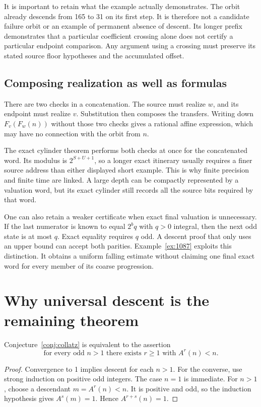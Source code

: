 It is important to retain what the example actually demonstrates. The orbit already descends from 165 to 31 on its first step. It is therefore not a candidate failure orbit or an example of permanent absence of descent. Its longer prefix demonstrates that a particular coefficient crossing alone does not certify a particular endpoint comparison. Any argument using a crossing must preserve its stated source floor hypotheses and the accumulated offset.

\subsection{Composing realization as well as formulas}
There are two checks in a concatenation. The source must realize $w$, and its endpoint must realize $v$. Substitution then composes the transfers. Writing down $F_v(F_w(n))$ without those two checks gives a rational affine expression, which may have no connection with the orbit from $n$.

The exact cylinder theorem performs both checks at once for the concatenated word. Its modulus is $2^{S+U+1}$, so a longer exact itinerary usually requires a finer source address than either displayed short example. This is why finite precision and finite time are linked. A large depth can be compactly represented by a valuation word, but its exact cylinder still records all the source bits required by that word.

One can also retain a weaker certificate when exact final valuation is unnecessary. If the last numerator is known to equal $2^b q$ with $q>0$ integral, then the next odd state is at most $q$. Exact equality requires $q$ odd. A descent proof that only uses an upper bound can accept both parities. Example~\ref{ex:1087} exploits this distinction. It obtains a uniform falling estimate without claiming one final exact word for every member of its coarse progression.

\section{Why universal descent is the remaining theorem}
\begin{theorem}\label{thm:induction}
Conjecture~\ref{conj:collatz} is equivalent to the assertion
\begin{equation}\label{eq:universal}
\text{for every odd }n>1\text{ there exists }r\ge1\text{ with }A^r(n)<n.
\end{equation}
\end{theorem}
\begin{proof}
Convergence to 1 implies descent for each $n>1$. For the converse, use strong induction on positive odd integers. The case $n=1$ is immediate. For $n>1$, choose a descendant $m=A^r(n)<n$. It is positive and odd, so the induction hypothesis gives $A^s(m)=1$. Hence $A^{r+s}(n)=1$.
\end{proof}

